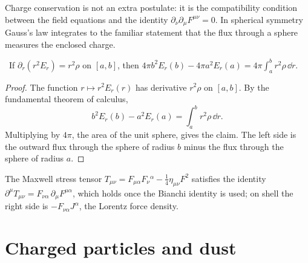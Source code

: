 Charge conservation is not an extra postulate: it is the compatibility condition between the field equations and the identity $\partial_\nu\partial_\mu F^{\mu\nu}=0$. In spherical symmetry Gauss's law integrates to the familiar statement that the flux through a sphere measures the enclosed charge.

\begin{proposition}\label{prop:gaussint}\ver\
If $\partial_r(r^2E_r)=r^2\rho$ on $[a,b]$, then $4\pi b^2E_r(b)-4\pi a^2E_r(a)=4\pi\int_a^br^2\rho\,\dd r$.
\end{proposition}
\begin{proof}
The function $r\mapsto r^2E_r(r)$ has derivative $r^2\rho$ on $[a,b]$. By the fundamental theorem of calculus,
\[
b^2E_r(b)-a^2E_r(a)=\int_a^br^2\rho\,\dd r .
\]
Multiplying by $4\pi$, the area of the unit sphere, gives the claim. The left side is the outward flux through the sphere of radius $b$ minus the flux through the sphere of radius $a$.
\end{proof}


The Maxwell stress tensor $T_{\mu\nu}=F_{\mu\alpha}F_\nu{}^\alpha-\frac14\eta_{\mu\nu}F^2$ satisfies the identity $\partial^\mu T_{\mu\nu}=F_{\nu\alpha}\,\partial_\mu F^{\mu\alpha}$, which holds once the Bianchi identity is used; on shell the right side is $-F_{\nu\alpha}J^\alpha$, the Lorentz force density.

\section{Charged particles and dust}


